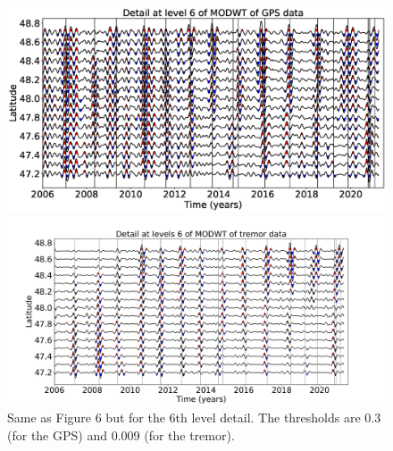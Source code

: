 \documentclass{article}
\begin{document}
\begin{figure}
\noindent\includegraphics[width=\textwidth, trim={0cm 0cm 0cm 0cm},clip]{figures/GPS_longer_detail_6.eps}

\noindent\includegraphics[width=\textwidth, trim={0cm 0cm 0cm 0cm},clip]{figures/tremor_longer_detail_6.pdf}
\caption{Same as Figure 6 but for the 6th level detail. The thresholds are 0.3 (for the GPS) and 0.009 (for the tremor).}
\label{pngfiguresample}
\end{figure}
\end{document}
